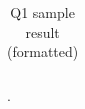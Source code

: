 \begin{table}[h]
\begin{tabular}{|l|l|r|r|}
\end{tabular}
\caption{Q1 sample result (formatted)} \label{tab:q1-results}.
\end{table}

